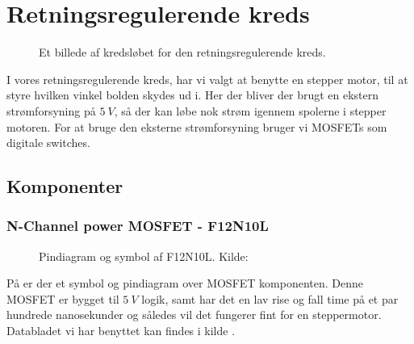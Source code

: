 \section{Retningsregulerende kreds}
\begin{figure}[H]	
	\centering
	\caption{Et billede af kredsløbet for den retningsregulerende kreds.}
	\label{kreds:retning}
\end{figure}
I vores retningsregulerende kreds, har vi valgt at benytte en stepper motor, til at styre hvilken vinkel bolden skydes ud i. Her der bliver der brugt en ekstern strømforsyning på $\SI{5}{V}$, så der kan løbe nok strøm igennem spolerne i stepper motoren. For at bruge den eksterne strømforsyning bruger vi MOSFETs som digitale switches.
\subsection{Komponenter}
\subsubsection{N-Channel power MOSFET - F12N10L}
\begin{figure}[H]
	\centering
	\caption{Pindiagram og symbol af F12N10L. Kilde:\cite{kompMOSFET}}
	\label{fig:kompMOSFET}
\end{figure}
På  er der et symbol og pindiagram over MOSFET komponenten.
Denne MOSFET er bygget til $\SI{5}{V}$ logik, samt har det en lav rise og fall time på et par hundrede nanosekunder og således vil det fungerer fint for en steppermotor. Databladet vi har benyttet kan findes i kilde \cite{kompMOSFET}. 

